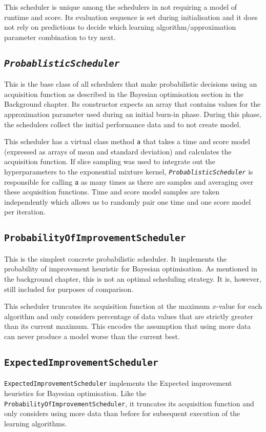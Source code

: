 \documentclass[a4paper,12pt,twoside,openright]{report}
\begin{document}
This scheduler is unique among the schedulers in not requiring a model of runtime and score. Its evaluation sequence is set during initialisation and it does not rely on predictions to decide which learning algorithm/approximation parameter combination to try next.



\subsection{\texttt{\textit{ProbablisticScheduler}}}

This is the base class of all schedulers that make probabilistic decisions using an acquisition function as described in the Bayesian optimisation section in the Background chapter. Its constructor expects an array that contains values for the approximation parameter used during an initial burn-in phase. During this phase, the schedulers collect the initial performance data and to not create model.

This scheduler has a virtual class method \texttt{a} that takes a time and score model (expressed as arrays of mean and standard deviation) and calculates the acquisition function. If slice sampling was used to integrate out the hyperparameters to the exponential mixture kernel, \texttt{\textit{ProbablisticScheduler}} is responsible for calling \texttt{a} as many times as there are samples and averaging over these acquisition functions. Time and score model samples are taken independently which allows us to randomly pair one time and one score model per iteration.

\subsection{\texttt{ProbabilityOfImprovementScheduler}}
This is the simplest concrete probabilistic scheduler. It implements the probability of improvement heuristic for Bayesian optimisation. As mentioned in the background chapter, this is not an optimal scheduling strategy. It is, however, still included for purposes of comparison.

This scheduler truncates its acquisition function at the maximum $x$-value for each algorithm and only considers percentage of data values that are strictly greater than its current maximum. This encodes the assumption that using more data can never produce a model worse than the current best.

\subsection{\texttt{ExpectedImprovementScheduler}}
\texttt{ExpectedImprovementScheduler} implements the Expected improvement heuristics for Bayesian optimisation. Like the \texttt{ProbabilityOfImprovementScheduler}, it truncates its acquisition function and only considers using more data than before for subsequent execution of the learning algorithms.
\end{document}
